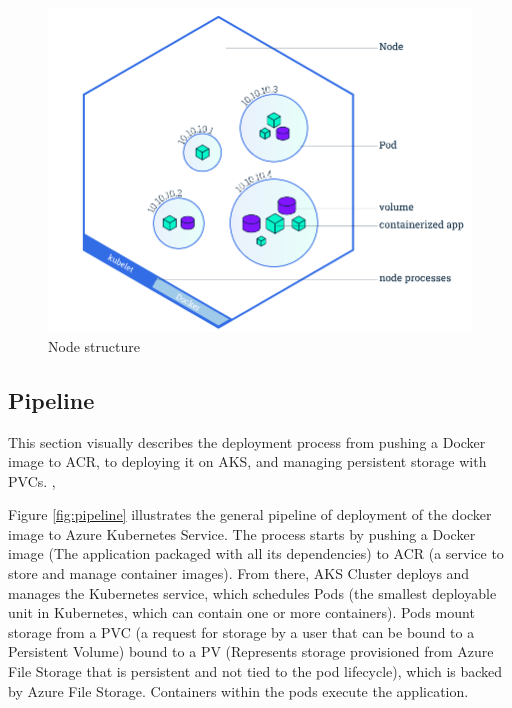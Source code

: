 \documentclass{article}
\begin{document}
\begin{figure}[H]
\includegraphics[scale=.35]{figures/node_fig.png}
\caption{Node structure \cite{kubboot}}
\label{fig:aks_node1}
\end{figure}

\subsection*{Pipeline}
This section visually describes the deployment process from pushing a Docker image to ACR, to deploying it on AKS, and managing persistent storage with PVCs. , 


Figure \ref{fig:pipeline} illustrates the general pipeline of deployment of the docker image to Azure Kubernetes Service. The process starts by pushing a Docker image (The application packaged with all its dependencies) to ACR (a service to store and manage container images). From there, AKS Cluster deploys and manages the Kubernetes service, which schedules Pods (the smallest deployable unit in Kubernetes, which can contain one or more containers). Pods mount storage from a PVC (a request for storage by a user that can be bound to a Persistent Volume) bound to a PV (Represents storage provisioned from Azure File Storage that is persistent and not tied to the pod lifecycle), which is backed by Azure File Storage. Containers within the pods execute the application.
\end{document}
